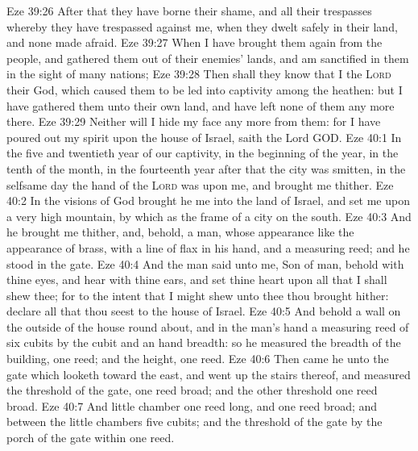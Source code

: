 \vs Eze 39:26 After that they have borne their shame, and all their trespasses whereby they have trespassed against me, when they dwelt safely in their land, and none made  afraid.
\vs Eze 39:27 When I have brought them again from the people, and gathered them out of their enemies' lands, and am sanctified in them in the sight of many nations;
\vs Eze 39:28 Then shall they know that I  the \textsc{Lord} their God, which caused them to be led into captivity among the heathen: but I have gathered them unto their own land, and have left none of them any more there.
\vs Eze 39:29 Neither will I hide my face any more from them: for I have poured out my spirit upon the house of Israel, saith the Lord GOD.
\vs Eze 40:1 In the five and twentieth year of our captivity, in the beginning of the year, in the tenth  of the month, in the fourteenth year after that the city was smitten, in the selfsame day the hand of the \textsc{Lord} was upon me, and brought me thither.
\vs Eze 40:2 In the visions of God brought he me into the land of Israel, and set me upon a very high mountain, by which  as the frame of a city on the south.
\vs Eze 40:3 And he brought me thither, and, behold,  a man, whose appearance  like the appearance of brass, with a line of flax in his hand, and a measuring reed; and he stood in the gate.
\vs Eze 40:4 And the man said unto me, Son of man, behold with thine eyes, and hear with thine ears, and set thine heart upon all that I shall shew thee; for to the intent that I might shew  unto thee  thou brought hither: declare all that thou seest to the house of Israel.
\vs Eze 40:5 And behold a wall on the outside of the house round about, and in the man's hand a measuring reed of six cubits  by the cubit and an hand breadth: so he measured the breadth of the building, one reed; and the height, one reed.
\vs Eze 40:6 Then came he unto the gate which looketh toward the east, and went up the stairs thereof, and measured the threshold of the gate,  one reed broad; and the other threshold  one reed broad.
\vs Eze 40:7 And  little chamber  one reed long, and one reed broad; and between the little chambers  five cubits; and the threshold of the gate by the porch of the gate within  one reed.
